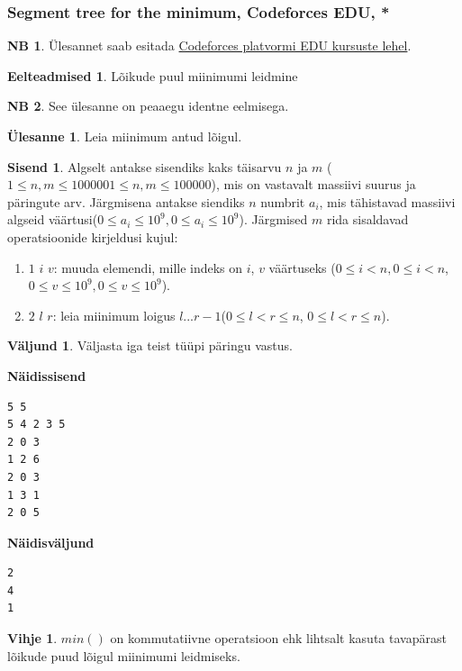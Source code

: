 \documentclass{trkut}
\theoremstyle{definition}
\newtheorem*{prereq}{Eelteadmised}
\newtheorem*{extra}{NB}
\newtheorem*{vihje}{Vihje}
\newtheorem*{Input}{Sisend}
\newtheorem*{Output}{Väljund}
\newtheorem*{Text}{Ülesanne}
\begin{document}
\subsubsection{Segment tree for the minimum, Codeforces EDU, *}
\begin{extra}
Ülesannet saab esitada \href{https://codeforces.com/edu/course/2/lesson/4/1/practice/contest/273169/problem/B}{Codeforces platvormi EDU kursuste lehel}.
\end{extra}
\begin{prereq}
Lõikude puul miinimumi leidmine
\end{prereq}
\begin{extra}
See ülesanne on peaaegu identne eelmisega.
\end{extra}
\begin{Text}
Leia miinimum antud lõigul.

\parencite{semin}
\end{Text}

\begin{Input}
Algselt antakse sisendiks kaks täisarvu $n$ ja $m$ ($1\le n,m\le 1000001\le n,m\le 100000$), mis on vastavalt massiivi suurus ja päringute arv.
Järgmisena antakse siendiks $n$ numbrit $a
_i$, mis tähistavad massiivi algseid väärtusi($0\le a_i\le 10^9,0\le a_i\le 10^9$).
Järgmised $m$ rida sisaldavad operatsioonide kirjeldusi kujul:
\begin{enumerate}
\item $1$ $i$ $v$: muuda elemendi, mille indeks on $i$, $v$ väärtuseks ($0\le i<n, 0\le i<n$, $0\le v\le 10^9, 0\le v\le 10^9$).
\item $2$ $l$ $r$: leia miinimum loigus $l$...$r−1$($0\le l<r\le n$, $0\le l<r\le n$).
\end{enumerate}
\end{Input}
\begin{Output}
Väljasta iga teist tüüpi päringu vastus.
\end{Output}

\textbf{Näidissisend}

\begin{verbatim}
5 5
5 4 2 3 5
2 0 3
1 2 6
2 0 3
1 3 1
2 0 5
\end{verbatim}

\textbf{Näidisväljund}

\begin{verbatim}
2
4
1
\end{verbatim}



\begin{vihje}
$min()$ on kommutatiivne operatsioon ehk lihtsalt kasuta tavapärast lõikude puud lõigul miinimumi leidmiseks.
\end{vihje}
\end{document}
